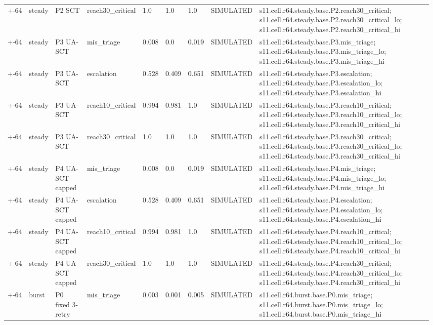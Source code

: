\begin{table}[t]
\begin{tabular}{lllllllll}
+-64 & steady & P2 SCT & reach30\_critical & 1.0 & 1.0 & 1.0 & SIMULATED & s11.cell.r64.steady.base.P2.reach30\_critical; s11.cell.r64.steady.base.P2.reach30\_critical\_lo; s11.cell.r64.steady.base.P2.reach30\_critical\_hi \\
+-64 & steady & P3 UA-SCT & mis\_triage & 0.008 & 0.0 & 0.019 & SIMULATED & s11.cell.r64.steady.base.P3.mis\_triage; s11.cell.r64.steady.base.P3.mis\_triage\_lo; s11.cell.r64.steady.base.P3.mis\_triage\_hi \\
+-64 & steady & P3 UA-SCT & escalation & 0.528 & 0.409 & 0.651 & SIMULATED & s11.cell.r64.steady.base.P3.escalation; s11.cell.r64.steady.base.P3.escalation\_lo; s11.cell.r64.steady.base.P3.escalation\_hi \\
+-64 & steady & P3 UA-SCT & reach10\_critical & 0.994 & 0.981 & 1.0 & SIMULATED & s11.cell.r64.steady.base.P3.reach10\_critical; s11.cell.r64.steady.base.P3.reach10\_critical\_lo; s11.cell.r64.steady.base.P3.reach10\_critical\_hi \\
+-64 & steady & P3 UA-SCT & reach30\_critical & 1.0 & 1.0 & 1.0 & SIMULATED & s11.cell.r64.steady.base.P3.reach30\_critical; s11.cell.r64.steady.base.P3.reach30\_critical\_lo; s11.cell.r64.steady.base.P3.reach30\_critical\_hi \\
+-64 & steady & P4 UA-SCT capped & mis\_triage & 0.008 & 0.0 & 0.019 & SIMULATED & s11.cell.r64.steady.base.P4.mis\_triage; s11.cell.r64.steady.base.P4.mis\_triage\_lo; s11.cell.r64.steady.base.P4.mis\_triage\_hi \\
+-64 & steady & P4 UA-SCT capped & escalation & 0.528 & 0.409 & 0.651 & SIMULATED & s11.cell.r64.steady.base.P4.escalation; s11.cell.r64.steady.base.P4.escalation\_lo; s11.cell.r64.steady.base.P4.escalation\_hi \\
+-64 & steady & P4 UA-SCT capped & reach10\_critical & 0.994 & 0.981 & 1.0 & SIMULATED & s11.cell.r64.steady.base.P4.reach10\_critical; s11.cell.r64.steady.base.P4.reach10\_critical\_lo; s11.cell.r64.steady.base.P4.reach10\_critical\_hi \\
+-64 & steady & P4 UA-SCT capped & reach30\_critical & 1.0 & 1.0 & 1.0 & SIMULATED & s11.cell.r64.steady.base.P4.reach30\_critical; s11.cell.r64.steady.base.P4.reach30\_critical\_lo; s11.cell.r64.steady.base.P4.reach30\_critical\_hi \\
+-64 & burst & P0 fixed 3-retry & mis\_triage & 0.003 & 0.001 & 0.005 & SIMULATED & s11.cell.r64.burst.base.P0.mis\_triage; s11.cell.r64.burst.base.P0.mis\_triage\_lo; s11.cell.r64.burst.base.P0.mis\_triage\_hi \\

\end{tabular}
\end{table}
